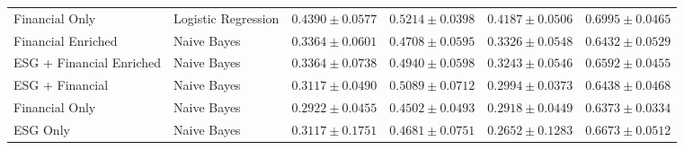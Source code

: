 \begin{table}[htbp]
\begin{tabular}{llrrrr}
    Financial Only & Logistic Regression & $0.4390 \pm 0.0577$ & $0.5214 \pm 0.0398$ & $0.4187 \pm 0.0506$ & $0.6995 \pm 0.0465$ \\
    Financial Enriched & Naive Bayes & $0.3364 \pm 0.0601$ & $0.4708 \pm 0.0595$ & $0.3326 \pm 0.0548$ & $0.6432 \pm 0.0529$ \\
    ESG + Financial Enriched & Naive Bayes & $0.3364 \pm 0.0738$ & $0.4940 \pm 0.0598$ & $0.3243 \pm 0.0546$ & $0.6592 \pm 0.0455$ \\
    ESG + Financial & Naive Bayes & $0.3117 \pm 0.0490$ & $0.5089 \pm 0.0712$ & $0.2994 \pm 0.0373$ & $0.6438 \pm 0.0468$ \\
    Financial Only & Naive Bayes & $0.2922 \pm 0.0455$ & $0.4502 \pm 0.0493$ & $0.2918 \pm 0.0449$ & $0.6373 \pm 0.0334$ \\
    ESG Only & Naive Bayes & $0.3117 \pm 0.1751$ & $0.4681 \pm 0.0751$ & $0.2652 \pm 0.1283$ & $0.6673 \pm 0.0512$ \\
    \bottomrule
  \end{tabular}
\end{table}